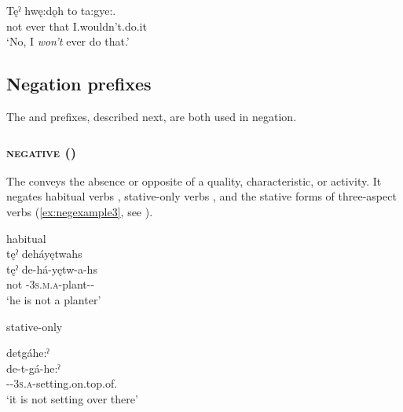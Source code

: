 \newpage
\ex
\gll Tęˀ hwę:dǫh to ta:gye:. \\
not ever that I.wouldn’t.do.it\\
\glt ‘No, I \emph{won’t} ever do that.’ 
\z
\z




\subsection{Negation prefixes} \label{Negation prefixes}
The  {\negative} and  {\contrastive} prefixes, described next, are both used in negation.


\subsubsection*{ \textsc{negative} ({\negative})} \label{[deˀ-] (negative) prefix}
The  {\negative} conveys the absence or opposite of a quality, characteristic, or activity. It negates habitual verbs , stative-only verbs , and the stative forms of three-aspect verbs (\ref{ex:negexample3}, see ).

\ea\label{ex:negexample1} habitual\\
tęˀ deháyętwahs  \\
\gll tęˀ de-há-yętw-a-hs\\
not {\negative}-\textsc{3s.m.a}-plant-{\joinerA}-{\habitual}\\
\glt ‘he is not a planter’
\z



\ea\label{ex:negexample2} stative-only

\ea detgáhe:ˀ\\
\gll de-t-gá-he:ˀ\\
{\negative}-{\cislocative}-\textsc{3s.a}-setting.on.top.of.{\stative}\\
\glt `it is not setting over there'


